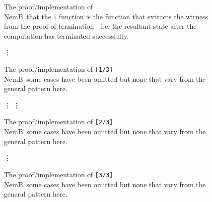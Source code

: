 \documentclass[oneside,12pt]{article}
\newcommand\NB[1][0.1]{N\kern-#1emB \,} %
\newcommand{\impcode}[1]{\textsc{\texttt{#1}}}
\begin{document}
\begin{figure}
  \caption{The proof/implementation of .
    \\ \NB that the $\dagger$ function is the function that extracts the witness from the proof of termination - i.e. the resultant state after the computation has terminated successfully.}
  \label{fig:evaldetfull}
  \centering
  \footnotesize
  
\end{figure}

\begin{figure}
  \caption{The proof/implementation of \mbox{} \;\; \impcode{[1/3]} \\
    \NB some cases have been omitted but none that vary from the general pattern here.}
  \label{fig:tsplitfull}
  \footnotesize
  {\centering }
  {\centering \hfill \Huge{\vdots} \hfill }
\end{figure}


\begin{figure}\ContinuedFloat
  \caption{The proof/implementation of \mbox{} \;\; \impcode{[2/3]} \\
   \NB some cases have been omitted but none that vary from the general pattern here. }
  \footnotesize
  {\centering \hfill \Huge{\vdots} \hfill }
  {\centering }
  {\centering \hfill \Huge{\vdots} \hfill }
\end{figure}

\begin{figure}\ContinuedFloat
  \caption{The proof/implementation of \mbox{} \;\; \impcode{[3/3]} \\
   \NB some cases have been omitted but none that vary from the general pattern here. }
  \footnotesize
  {\centering \hfill \Huge{\vdots} \hfill }
  {\centering }
\end{figure}
\end{document}
